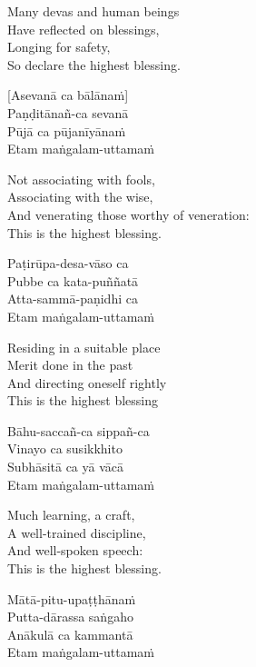 \begin{english}
  Many devas and human beings\\
  Have reflected on blessings,\\
  Longing for safety,\\
  So declare the highest blessing.
\end{english}

[Asevanā ca bālānaṁ]\\
Paṇḍitānañ-ca sevanā\\
Pūjā ca pūjanīyānaṁ\\
Etam maṅgalam-uttamaṁ

\begin{english}
  Not associating with fools,\\
  Associating with the wise,\\
  And venerating those worthy of veneration:\\
  This is the highest blessing.
\end{english}

Paṭirūpa-desa-vāso ca\\
Pubbe ca kata-puññatā\\
Atta-sammā-paṇidhi ca\\
Etam maṅgalam-uttamaṁ

\begin{english}
  Residing in a suitable place\\
  Merit done in the past\\
  And directing oneself rightly\\
  This is the highest blessing
\end{english}

Bāhu-saccañ-ca sippañ-ca\\
Vinayo ca susikkhito\\
Subhāsitā ca yā vācā\\
Etam maṅgalam-uttamaṁ

\begin{english}
  Much learning, a craft,\\
  A well-trained discipline,\\
  And well-spoken speech:\\
  This is the highest blessing.
\end{english}

Mātā-pitu-upaṭṭhānaṁ\\
Putta-dārassa saṅgaho\\
Anākulā ca kammantā\\
Etam maṅgalam-uttamaṁ

